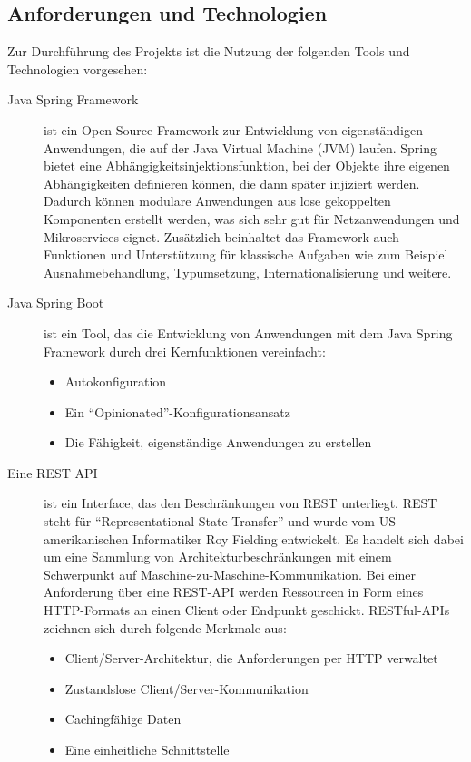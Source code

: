 \subsection{Anforderungen und Technologien}\label{anforderungen-und-technologien}
Zur Durchführung des Projekts ist die Nutzung der folgenden Tools und Technologien vorgesehen:

\begin{description}
 \item[Java Spring Framework] ist ein Open-Source-Framework zur Entwicklung von eigenständigen Anwendungen, die auf der Java Virtual Machine (JVM) laufen. Spring bietet eine Abhängigkeitsinjektionsfunktion, bei der Objekte ihre eigenen Abhängigkeiten definieren können, die dann später injiziert werden. Dadurch können modulare Anwendungen aus lose gekoppelten Komponenten erstellt werden, was sich sehr gut für Netzanwendungen und Mikroservices eignet. Zusätzlich beinhaltet das Framework auch Funktionen und Unterstützung für klassische Aufgaben wie zum Beispiel Ausnahmebehandlung, Typumsetzung, Internationalisierung und weitere.

 \item[Java Spring Boot] ist ein Tool, das die Entwicklung von Anwendungen mit dem Java Spring Framework durch drei Kernfunktionen vereinfacht:
    \begin{itemize}
        \item Autokonfiguration
        \item Ein \enquote{Opinionated}-Konfigurationsansatz
        \item Die Fähigkeit, eigenständige Anwendungen zu erstellen
    \end{itemize}

 \item[Eine REST API] ist ein Interface, das den Beschränkungen von REST unterliegt. REST steht für \enquote{Representational State Transfer} und wurde vom US-amerikanischen Informatiker Roy Fielding entwickelt. Es handelt sich dabei um eine Sammlung von Architekturbeschränkungen mit einem Schwerpunkt auf Maschine-zu-Maschine-Kommunikation. Bei einer Anforderung über eine REST-API werden Ressourcen in Form eines HTTP-Formats an einen Client oder Endpunkt geschickt. RESTful-APIs zeichnen sich durch folgende Merkmale aus:
 \begin{itemize}
     \item Client/Server-Architektur, die Anforderungen per HTTP verwaltet
     \item Zustandslose Client/Server-Kommunikation
     \item Cachingfähige Daten
     \item Eine einheitliche Schnittstelle
 \end{itemize}


\end{description}

